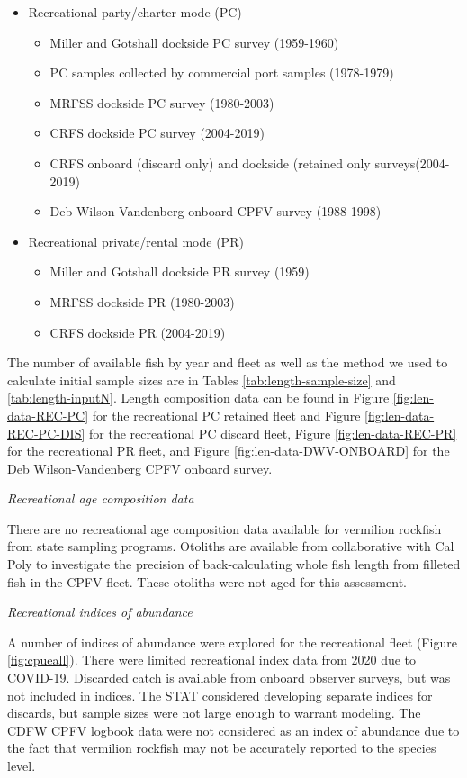\documentclass[
  english,
  a4paper,
]{article}
\begin{document}
\begin{itemize}
  \item Recreational party/charter mode (PC)
   \begin{itemize}
     \item Miller and Gotshall dockside PC survey (1959-1960) 
     \item PC samples collected by commercial port samples (1978-1979)
     \item MRFSS dockside PC survey (1980-2003)    
     \item CRFS dockside PC survey (2004-2019)
     \item CRFS onboard (discard only) and dockside (retained only surveys(2004-2019)
     \item Deb Wilson-Vandenberg onboard CPFV survey (1988-1998)
   \end{itemize}
  \item Recreational private/rental mode (PR)
   \begin{itemize}
     \item Miller and Gotshall dockside PR survey (1959) 
     \item MRFSS dockside PR (1980-2003)
     \item CRFS dockside PR (2004-2019)
  \end{itemize}
\end{itemize}

The number of available fish by year and fleet as well as the method we used to
calculate initial sample sizes are in Tables \ref{tab:length-sample-size} and \ref{tab:length-inputN}.
Length composition data can be found in Figure
\ref{fig:len-data-REC-PC} for the recreational PC retained fleet and Figure \ref{fig:len-data-REC-PC-DIS} for
the recreational PC discard fleet, Figure \ref{fig:len-data-REC-PR} for the recreational PR fleet, and Figure \ref{fig:len-data-DWV-ONBOARD} for the Deb Wilson-Vandenberg CPFV onboard survey.

\emph{Recreational age composition data}

There are no recreational age composition data available for vermilion rockfish from state sampling programs.
Otoliths are available from collaborative with Cal Poly to investigate
the precision of back-calculating whole fish length from filleted fish in the CPFV fleet.
These otoliths were not aged for this assessment.

\emph{Recreational indices of abundance}

A number of indices of abundance were explored for the recreational fleet (Figure \ref{fig:cpueall}). There were limited recreational index data from 2020 due to COVID-19. Discarded catch is available from onboard observer surveys, but was not included in indices. The STAT considered developing separate indices for discards, but sample sizes were not large enough to warrant modeling. The CDFW CPFV logbook data were not considered as an index of abundance due to the fact that
vermilion rockfish may not be accurately reported to the species level.
\end{document}
